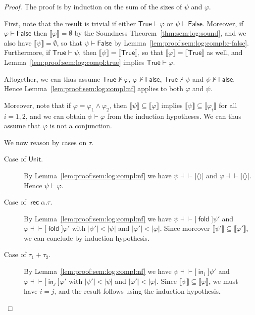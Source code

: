 \documentclass[%
  a4paper,
  UKenglish,
  cleveref,
  autoref,
  thm-restate,
  numberwithinsect,
]{lipics-v2021}
\newcommand\sle\subseteq
\newcommand\thesis{\vdash}
\newcommand\defthesisiff{\dashv\vdash}
\newcommand\thesisiff{\mathrel{\defthesisiff}}
\newcommand\pair[1]{{\langle #1\rangle}}
\newcommand\I[1]{\llbracket #1 \rrbracket} %
\newcommand\temp[1]{\mathsf{#1}}
\newcommand\True{\temp{True}}
\newcommand\False{\temp{False}}
\newcommand\term[1]{\mathsf{#1}}
\newcommand\type[1]{\term{#1}}
\newcommand\inj{\mathop{\term{in}}}
\newcommand\fold{\mathop{\term{fold}}}
\newcommand\Unit{\type{Unit}}
\newcommand\rec{\mathop{\type{rec}}}	%
\newcommand\TV{\alpha}		%
\newcommand\PT{\tau}		%
\newcommand\form[1]{\lbrack #1 \rbrack}
\begin{document}
\begin{proof}
The proof is by induction on the sum of the 
sizes of $\psi$ and $\varphi$.

First, note that the result is trivial if either
$\True \thesis \varphi$
or $\psi \thesis \False$.
%
Moreover, if $\varphi \thesis \False$
then $\I\varphi = \emptyset$ by the Soundness Theorem~\ref{thm:sem:log:sound},
and we also have $\I\psi = \emptyset$,
so that $\psi \thesis \False$
by Lemma~\ref{lem:proof:sem:log:compl:c-false}.
%
Furthermore, if $\True \thesis \psi$,
then $\I\psi = \I\True$,
so that $\I\varphi = \I\True$ as well,
and Lemma~\ref{lem:proof:sem:log:compl:true}
implies $\True \thesis \varphi$.

Altogether, we can thus assume
$\True \not\thesis \varphi$,
$\varphi \not\thesis \False$,
$\True \not\thesis \psi$
and
$\psi \not\thesis \False$.
Hence Lemma~\ref{lem:proof:sem:log:compl:nf}
applies to both $\varphi$ and $\psi$.

Moreover, note that if $\varphi = \varphi_1 \land \varphi_2$,
then $\I\psi \sle \I\varphi$ implies
$\I\psi \sle \I{\varphi_i}$ for all $i = 1,2$,
and we can obtain $\psi \thesis \varphi$ from the induction hypotheses.
%
We can thus assume that $\varphi$ is not a conjunction.

We now reason by cases on $\PT$.
\begin{description}
\item[Case of $\Unit$.]
By Lemma~\ref{lem:proof:sem:log:compl:nf}
we have
$\psi \thesisiff \form{\pair{}}$
and $\varphi \thesisiff \form{\pair{}}$.
Hence $\psi \thesis \varphi$.

\item[Case of $\rec \TV.\PT$.]
By Lemma~\ref{lem:proof:sem:log:compl:nf}
we have
$\psi \thesisiff \form{\fold} \psi'$
and $\varphi \thesisiff \form{\fold} \varphi'$
with $|\psi'| < |\psi|$
and $|\varphi'| < |\varphi|$.
%
Since moreover $\I{\psi'} \sle \I{\varphi'}$,
we can conclude by induction hypothesis.

\item[Case of $\PT_1 + \PT_2$.]
By Lemma~\ref{lem:proof:sem:log:compl:nf}
we have
$\psi \thesisiff \form{\inj_i} \psi'$
and $\varphi \thesisiff \form{\inj_j} \varphi'$
with $|\psi'| < |\psi|$
and $|\varphi'| < |\varphi|$.
%
Since $\I\psi \sle \I\varphi$,
we must have $i = j$,
and the result follows using the induction hypothesis.


\end{description}
\end{proof}
\end{document}
